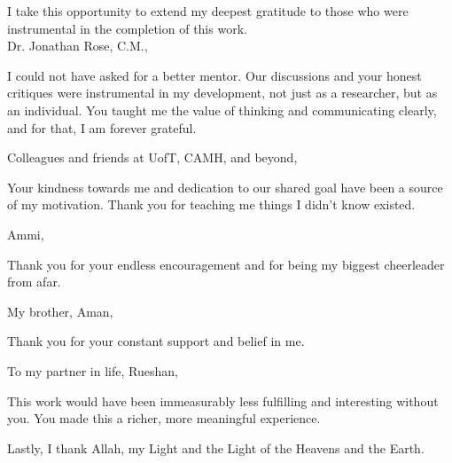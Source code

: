 \noindent I take this opportunity to extend my deepest gratitude to those who were instrumental in the completion of this work.\\

\noindent Dr. Jonathan Rose, C.M.,\vspace{-5pt}
\begin{addmargin}[1em]{2em}
I could not have asked for a better mentor. Our discussions and your honest critiques were instrumental in my development, not just as a researcher, but as an individual. You taught me the value of thinking and communicating clearly, and for that, I am forever grateful.\\
\end{addmargin}

\noindent Colleagues and friends at UofT, CAMH, and beyond,\vspace{-5pt}
\begin{addmargin}[1em]{2em}
\indent Your kindness towards me and dedication to our shared goal have been a source of my motivation. Thank you for teaching me things I didn't know existed.\\
\end{addmargin}

\noindent Ammi,\vspace{-5pt}
\begin{addmargin}[1em]{2em}
Thank you for your endless encouragement and for being my biggest cheerleader from afar.\\
\end{addmargin}

\noindent My brother, Aman,\vspace{-5pt}
\begin{addmargin}[1em]{2em}
Thank you for your constant support and belief in me.\\
\end{addmargin}

\noindent To my partner in life, Rueshan,\vspace{-5pt}
\begin{addmargin}[1em]{2em}
\indent This work would have been immeasurably less fulfilling and interesting without you. You made this a richer, more meaningful experience.\\
\end{addmargin}

\noindent Lastly, I thank Allah, my Light and the Light of the Heavens and the Earth.